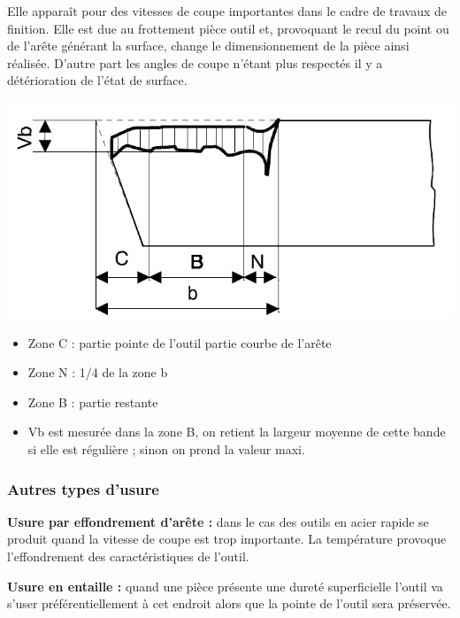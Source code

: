 \documentclass[11pt,oneside]{article}
\begin{document}
Elle apparaît pour des vitesses de coupe importantes dans le cadre de travaux de finition. Elle est due au frottement pièce outil et, provoquant le recul du point ou de l'arête générant la surface, change le dimensionnement de la pièce ainsi réalisée. D'autre part les angles de coupe n'étant plus respectés il y a détérioration de l'état de surface.

\noindent \begin{minipage}[c]{.45\linewidth}
\begin{center}
\includegraphics[width=.8\textwidth]{png/fig_08}
\end{center}
\end{minipage}\hfill
\begin{minipage}[c]{.45\linewidth}
\begin{itemize}
\item Zone C : partie pointe de l'outil partie courbe de l'arête
\item Zone N : 1/4 de la zone b
\item Zone B : partie restante 
\item Vb est mesurée dans la zone B, on retient la largeur moyenne de cette bande si elle est régulière ; sinon on prend la valeur maxi.
\end{itemize}
\end{minipage}



\subsubsection{Autres types d'usure}
\textbf{Usure par effondrement d'arête :} dans le cas des outils en acier rapide se produit quand la vitesse de coupe est trop importante. La température provoque l'effondrement des caractéristiques de l'outil.

\textbf{Usure en entaille :} quand une pièce présente une dureté superficielle l'outil va s'user préférentiellement à cet endroit alors que la pointe de l'outil sera préservée.
\end{document}
